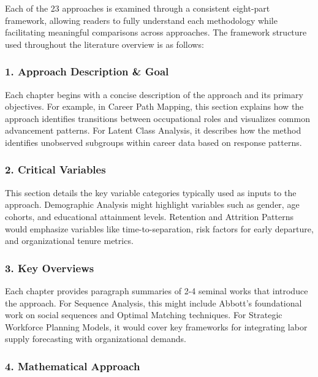 \documentclass[./main.tex]{subfiles}
\begin{document}
Each of the 23 approaches is examined through a consistent eight-part
framework, allowing readers to fully understand each methodology while
facilitating meaningful comparisons across approaches. The framework
structure used throughout the literature overview is as follows:

\subsubsection{1. Approach Description \&
Goal}\label{approach-description-goal}

Each chapter begins with a concise description of the approach and its
primary objectives. For example, in Career Path Mapping, this section
explains how the approach identifies transitions between occupational
roles and visualizes common advancement patterns. For Latent Class
Analysis, it describes how the method identifies unobserved subgroups
within career data based on response patterns.

\subsubsection{2. Critical Variables}\label{critical-variables}

This section details the key variable categories typically used as
inputs to the approach. Demographic Analysis might highlight variables
such as gender, age cohorts, and educational attainment levels.
Retention and Attrition Patterns would emphasize variables like
time-to-separation, risk factors for early departure, and organizational
tenure metrics.

\subsubsection{3. Key Overviews}\label{key-overviews}

Each chapter provides paragraph summaries of 2-4 seminal works that
introduce the approach. For Sequence Analysis, this might include
Abbott's foundational work on social sequences and Optimal Matching
techniques. For Strategic Workforce Planning Models, it would cover key
frameworks for integrating labor supply forecasting with organizational
demands.

\subsubsection{4. Mathematical Approach}\label{mathematical-approach}
\end{document}
